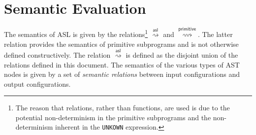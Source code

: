 \documentclass{book}
\newcommand\evalarrow[0]{\stackrel{\mathsf{asl}}{\rightsquigarrow}}
\newcommand\evalprimitivearrow[0]{\stackrel{\mathsf{primitive}}{\rightsquigarrow}}
\begin{document}
\section{Semantic Evaluation}

The semantics of ASL is given by the relations\footnote{The reason that relations, rather than functions, are used is due to the
potential non-determinism in the primitive subprograms
and the non-determinism inherent in the \texttt{UNKOWN} expression.}
$\evalarrow$ and $\evalprimitivearrow$.
The latter relation provides the semantics of primitive subprograms and is not otherwise defined
constructively.
The relation $\evalarrow$ is defined as the disjoint union of the relations defined in this document.
%
The semantics of the various types of AST nodes is given by a set of \emph{semantic relations} between
input configurations and output configurations.

\end{document}
